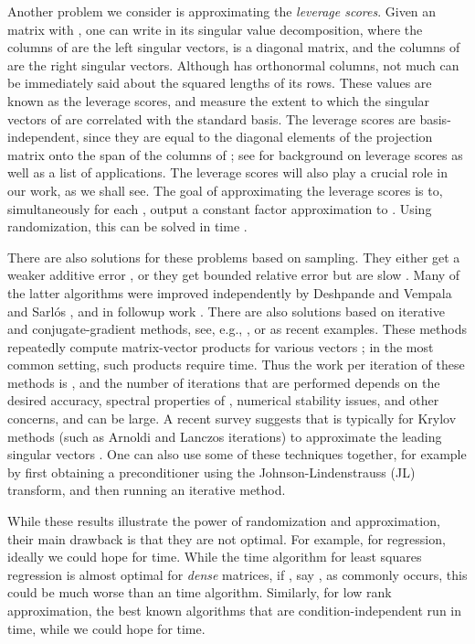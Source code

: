 \documentclass{sig-alternate}
\begin{document}
Another problem we consider is approximating the {\it leverage scores}. 
Given an  matrix  with , one can write
 in its singular value decomposition, where the columns of  are the left singular vectors,
 is a diagonal matrix, and the columns of  are the right singular vectors. Although 
has orthonormal columns, not much can be immediately said about the squared lengths  of its rows.
These values are known as the leverage scores, and measure the extent to which the singular vectors of  
are correlated with the standard basis. The leverage scores are basis-independent, since
they are equal to the diagonal elements of the projection matrix onto the
span of the columns of ; see \cite{DMMW12} for background on leverage scores 
as well as a list of applications. 
The leverage scores will also play a crucial role in our work, as we shall see. 
The goal of approximating the leverage scores is to, 
simultaneously for each , output a constant factor approximation to . 
Using randomization, this can be solved in  time \cite{DMMW12}.

There are also solutions for these problems based on sampling. They either get a weaker additive error
\cite{fkv04,prtv00,am07,dkm06,dkm06a,dkm06b,dm05,rv07,drvw06},
or they get bounded relative error but are slow \cite{dv06,dmm06,dmm06b,dmm06c}.
Many of the latter algorithms
were improved independently by Deshpande and Vempala \cite{dv06} and Sarl\'os \cite{s06}, and in followup work
\cite{dmms11,ndt09,mz11}. 
There are also solutions based on iterative and conjugate-gradient methods, see, e.g., \cite{tb_nla},
or \cite{zf12} as recent examples. These methods repeatedly compute matrix-vector products
 for various vectors ; in the most common setting, such products require 
time. Thus the work per iteration of these methods is ,
and the number of iterations  that are performed depends on the desired accuracy,
spectral properties of , numerical stability issues, and other concerns,
and can be large. A recent survey suggests that  is typically 
for Krylov methods (such as Arnoldi
and Lanczos iterations) to approximate
the  leading singular vectors \cite{HMT}.
One can also use some of these techniques together, for example by first obtaining a preconditioner using the
Johnson-Lindenstrauss (JL) transform, and then running an iterative method. 




While these results illustrate the power of randomization and approximation, their main drawback
is that they are not optimal. For example, for regression, ideally we could hope for 
time. While the  time algorithm for least squares regression
is almost optimal for {\it dense} matrices, if , say , as commonly
occurs, this could be much worse than an  time algorithm.
Similarly, for low rank approximation, the best known algorithms that are condition-independent run in 
 time, while we could hope
for  time. 
\end{document}
